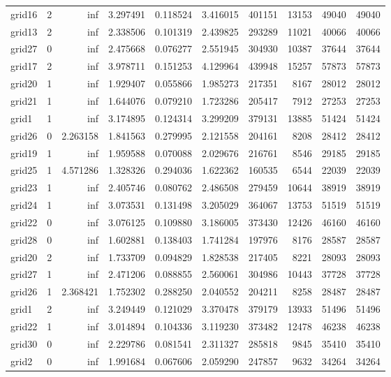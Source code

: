 \begin{longtable}{|l|r|r|r|r|r|r|r|r|r|}
grid16 & 2 & inf & 3.297491 & 0.118524 & 3.416015 & 401151 & 13153 & 49040 & 49040 \\
grid13 & 2 & inf & 2.338506 & 0.101319 & 2.439825 & 293289 & 11021 & 40066 & 40066 \\
grid27 & 0 & inf & 2.475668 & 0.076277 & 2.551945 & 304930 & 10387 & 37644 & 37644 \\
grid17 & 2 & inf & 3.978711 & 0.151253 & 4.129964 & 439948 & 15257 & 57873 & 57873 \\
grid20 & 1 & inf & 1.929407 & 0.055866 & 1.985273 & 217351 & 8167 & 28012 & 28012 \\
grid21 & 1 & inf & 1.644076 & 0.079210 & 1.723286 & 205417 & 7912 & 27253 & 27253 \\
grid1 & 1 & inf & 3.174895 & 0.124314 & 3.299209 & 379131 & 13885 & 51424 & 51424 \\
grid26 & 0 & 2.263158 & 1.841563 & 0.279995 & 2.121558 & 204161 & 8208 & 28412 & 28412 \\
grid19 & 1 & inf & 1.959588 & 0.070088 & 2.029676 & 216761 & 8546 & 29185 & 29185 \\
grid25 & 1 & 4.571286 & 1.328326 & 0.294036 & 1.622362 & 160535 & 6544 & 22039 & 22039 \\
grid23 & 1 & inf & 2.405746 & 0.080762 & 2.486508 & 279459 & 10644 & 38919 & 38919 \\
grid24 & 1 & inf & 3.073531 & 0.131498 & 3.205029 & 364067 & 13753 & 51519 & 51519 \\
grid22 & 0 & inf & 3.076125 & 0.109880 & 3.186005 & 373430 & 12426 & 46160 & 46160 \\
grid28 & 0 & inf & 1.602881 & 0.138403 & 1.741284 & 197976 & 8176 & 28587 & 28587 \\
grid20 & 2 & inf & 1.733709 & 0.094829 & 1.828538 & 217405 & 8221 & 28093 & 28093 \\
grid27 & 1 & inf & 2.471206 & 0.088855 & 2.560061 & 304986 & 10443 & 37728 & 37728 \\
grid26 & 1 & 2.368421 & 1.752302 & 0.288250 & 2.040552 & 204211 & 8258 & 28487 & 28487 \\
grid1 & 2 & inf & 3.249449 & 0.121029 & 3.370478 & 379179 & 13933 & 51496 & 51496 \\
grid22 & 1 & inf & 3.014894 & 0.104336 & 3.119230 & 373482 & 12478 & 46238 & 46238 \\
grid30 & 0 & inf & 2.229786 & 0.081541 & 2.311327 & 285818 & 9845 & 35410 & 35410 \\
grid2 & 0 & inf & 1.991684 & 0.067606 & 2.059290 & 247857 & 9632 & 34264 & 34264 \\

\end{longtable}
